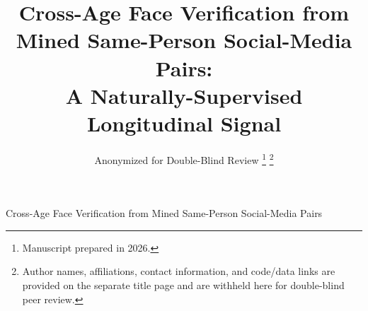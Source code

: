 \documentclass[journal]{IEEEtran}
\begin{document}
\title{Cross-Age Face Verification from Mined Same-Person Social-Media Pairs:\\ A Naturally-Supervised Longitudinal Signal}

\author{Anonymized for Double-Blind Review%
\thanks{Manuscript prepared in 2026.}%
\thanks{Author names, affiliations, contact information, and code/data links are provided on the separate title page and are withheld here for double-blind peer review.}}

%
{Cross-Age Face Verification from Mined Same-Person Social-Media Pairs}

\maketitle
\end{document}
